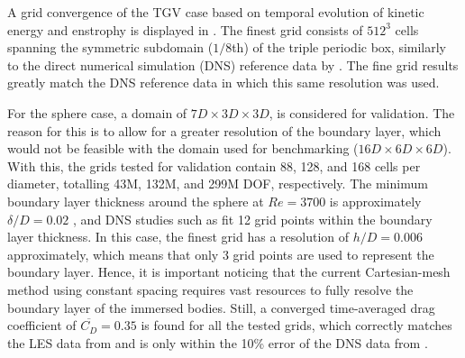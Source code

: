\documentclass[10pt,a4paper]{article}
\begin{document}
A grid convergence of the TGV case based on temporal evolution of kinetic energy and enstrophy is displayed in . The finest grid consists of $512^3$ cells spanning the symmetric subdomain ($1/8$th) of the triple periodic box, similarly to the direct numerical simulation (DNS) reference data by \cite{Dairay2017}. The fine grid results greatly match the DNS reference data in which this same resolution was used.

For the sphere case, a domain of $7D\times3D\times3D$,  is considered for validation. The reason for this is to allow for a greater resolution of the boundary layer, which would not be feasible with the domain used for benchmarking ($16D\times6D\times6D$). With this, the grids tested for validation contain 88, 128, and 168 cells per diameter, totalling 43M, 132M, and 299M DOF, respectively. The minimum boundary layer thickness around the sphere at $Re=3700$ is approximately $\delta/D=0.02$ \citep{Capuano2023}, and DNS studies such as \cite{Rodriguez2011} fit 12 grid points within the boundary layer thickness. In this case, the finest grid has a resolution of $h/D=0.006$ approximately, which means that only 3 grid points are used to represent the boundary layer. Hence, it is important noticing that the current Cartesian-mesh method using constant spacing requires vast resources to fully resolve the boundary layer of the immersed bodies. Still, a converged time-averaged drag coefficient of $\overline{C_D}=0.35$ is found for all the tested grids, which correctly matches the LES data from \cite{Yun2006} and is only within the 10\% error of the DNS data from \cite{Rodriguez2011}.

\end{document}
